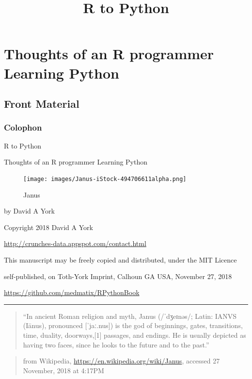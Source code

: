 \documentclass[]{book}
\title{R to Python}
\author{}
\date{}
\theoremstyle{definition}
\theoremstyle{definition}
\theoremstyle{definition}
\theoremstyle{remark}
\begin{document}
\maketitle

{
\setcounter{tocdepth}{1}
\tableofcontents
}
\part{Thoughts of an R programmer Learning
Python}\label{part-thoughts-of-an-r-programmer-learning-python}

\chapter{Front Material}\label{front-material}

\section{Colophon}\label{colophon}

R to Python

Thoughts of an R programmer Learning Python

\begin{figure}
\centering
\texttt{[image: images/Janus-iStock-494706611alpha.png]}
\caption{Janus}
\end{figure}

by David A York

Copyright 2018 David A York

\url{http://crunches-data.appspot.com/contact.html}

This manuscript may be freely copied and distributed, under the MIT
Licence

self-published, on Toth-York Imprint, Calhoun GA USA, November 27, 2018

\url{https://github.com/medmatix/RPythonBook}

\begin{center}\rule{0.5\linewidth}{\linethickness}\end{center}

\begin{quote}
``In ancient Roman religion and myth, Janus (/ˈdʒeɪnəs/; Latin: IANVS
(Iānus), pronounced {[}ˈjaː.nus{]}) is the god of beginnings, gates,
transitions, time, duality, doorways,{[}1{]} passages, and endings. He
is usually depicted as having two faces, since he looks to the future
and to the past.''
\end{quote}

\begin{quote}
from Wikipedia, \url{https://en.wikipedia.org/wiki/Janus}, accessed 27
November, 2018 at 4:17PM
\end{quote}
\end{document}
